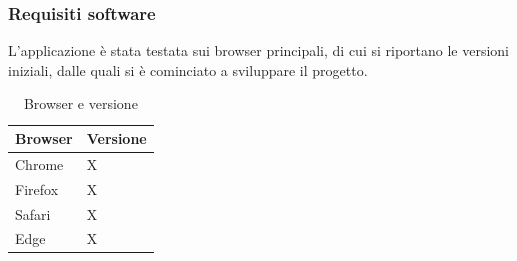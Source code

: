 \subsubsection{Requisiti software}
L’applicazione è stata testata sui browser principali, di cui si riportano le versioni iniziali, dalle quali si
è cominciato a sviluppare il progetto.
\begin{table}[H]
    \centering
    \caption{Browser e versione}
    \begin{tabular}{ll}
        \toprule
        \textbf{Browser} & \textbf{Versione} \\
        \midrule
        Chrome & X \\
        Firefox & X \\
        Safari & X \\
        Edge & X \\
        \bottomrule
    \end{tabular}
\end{table}
